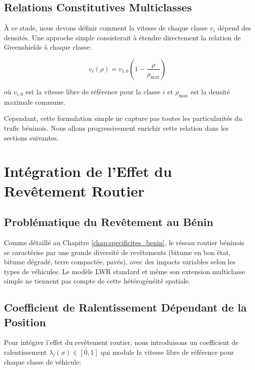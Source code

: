 \subsection{Relations Constitutives Multiclasses}
\label{subsec:relations_constitutives}

À ce stade, nous devons définir comment la vitesse de chaque classe $v_i$ dépend des densités. Une approche simple consisterait à étendre directement la relation de Greenshields à chaque classe:

\begin{equation}
v_i(\rho) = v_{i,0}\left(1 - \frac{\rho}{\rho_{\max}}\right)
\label{eq:vitesse_multiclasse_simple}
\end{equation}

où $v_{i,0}$ est la vitesse libre de référence pour la classe $i$ et $\rho_{\max}$ est la densité maximale commune.

Cependant, cette formulation simple ne capture pas toutes les particularités du trafic béninois. Nous allons progressivement enrichir cette relation dans les sections suivantes.

\section{Intégration de l'Effet du Revêtement Routier}
\label{sec:effet_revetement}

\subsection{Problématique du Revêtement au Bénin}
\label{subsec:problematique_revetement}

Comme détaillé au Chapitre \ref{chap:specificites_benin}, le réseau routier béninois se caractérise par une grande diversité de revêtements (bitume en bon état, bitume dégradé, terre compactée, pavés), avec des impacts variables selon les types de véhicules. Le modèle LWR standard et même son extension multiclasse simple ne tiennent pas compte de cette hétérogénéité spatiale.

\subsection{Coefficient de Ralentissement Dépendant de la Position}
\label{subsec:coefficient_ralentissement}

Pour intégrer l'effet du revêtement routier, nous introduisons un coefficient de ralentissement $\lambda_i(x) \in [0,1]$ qui module la vitesse libre de référence pour chaque classe de véhicule:

